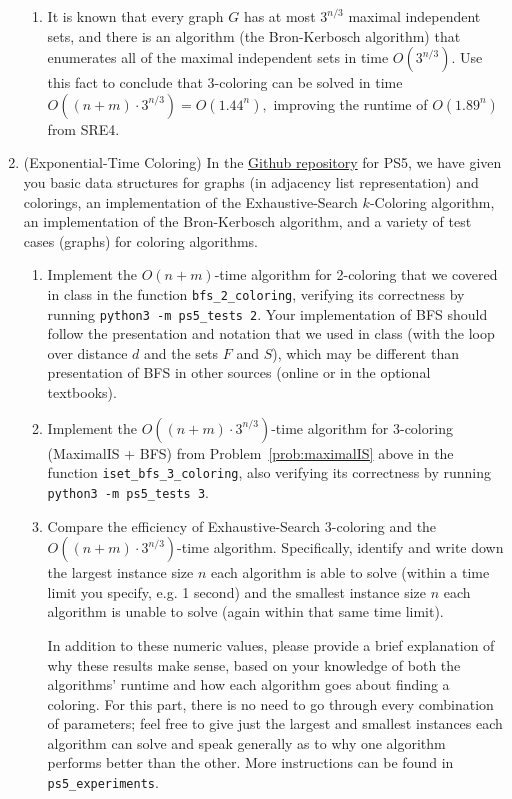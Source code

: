 \documentclass[11pt]{article}
\begin{document}
\begin{enumerate}
\begin{enumerate}
        \item It is known that every graph $G$ has at most $3^{n/3}$ maximal independent sets, and there is an algorithm (the Bron-Kerbosch algorithm) that enumerates all of the maximal independent sets in time $O(3^{n/3}).$  Use this fact to conclude that 3-coloring can be solved in time $O((n+m)\cdot 3^{n/3}) = O(1.44^n),$ improving the runtime of $O(1.89^n)$ from SRE4.\\
    \end{enumerate}
 
 \item (Exponential-Time Coloring) 
  In the \href{https://github.com/Harvard-CS-120/cs120/tree/main/fall2022/psets}{Github repository} for PS5, we have given you basic data structures for graphs (in adjacency list representation) and colorings, an implementation of the Exhaustive-Search $k$-Coloring algorithm, 
  an implementation of the Bron-Kerbosch algorithm, and a variety of test cases (graphs) for coloring algorithms. 

  \begin{enumerate}
      \item Implement the $O(n+m)$-time algorithm for 2-coloring that we covered in class in the function \texttt{bfs\_2\_coloring}, verifying its correctness by running \texttt{python3 -m ps5\_tests 2}.
        Your implementation of BFS should follow the presentation and notation that we used in class (with the loop over distance $d$ and the sets $F$ and $S$), which may be different than presentation of BFS in other sources (online or in the optional textbooks). 
        
      \item Implement the $O((n+m)\cdot 3^{n/3})$-time algorithm for 3-coloring (MaximalIS + BFS) from Problem~\ref{prob:maximalIS} above in the function \texttt{iset\_bfs\_3\_coloring}, also verifying its correctness by running \texttt{python3 -m ps5\_tests 3}. \label{part:TbT}
    
    \item Compare the efficiency of Exhaustive-Search 3-coloring and the $O((n+m)\cdot 3^{n/3})$-time algorithm. Specifically, identify and write down the largest instance size $n$ each algorithm is able to solve (within a time limit you specify, e.g. 1 second) and the smallest instance size $n$ each algorithm is unable to solve (again within that same time limit). 
    
    In addition to these numeric values, please provide a brief explanation of why these results make sense, based on your knowledge of both the algorithms' runtime and how each algorithm goes about finding a coloring. For this part, there is no need to go through every combination of parameters; feel free to give just the largest and smallest instances each algorithm can solve and speak generally as to why one algorithm performs better than the other. More instructions can be found in \texttt{ps5\_experiments}.
    

\end{enumerate}
\end{enumerate}
\end{document}

